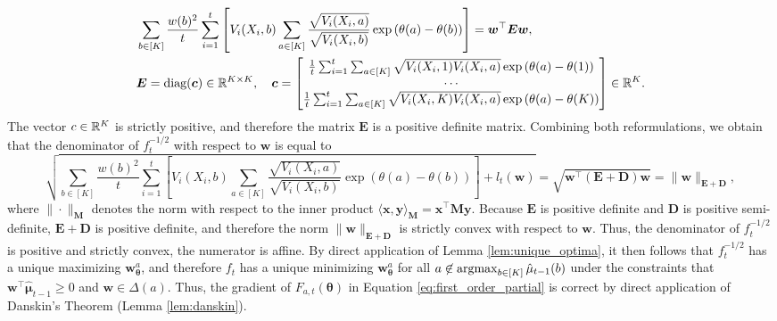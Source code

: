 \documentclass{article}
\begin{document}
\begin{appendices}
\begin{align}
     &\sum_{b \in [K]} \frac{w(b)^2}{t} \sum_{i=1}^t\left[V_i(X_i,b)\sum_{a \in [K]}\frac{ \sqrt{V_i(X_i,a) } }{\sqrt{V_i(X_i,b) } }\exp\left(\theta(a) - \theta(b)\right)\right] = \boldsymbol{w}^\top \boldsymbol{E} \boldsymbol{w}, \\
     &\boldsymbol{E} = \text{diag}(\boldsymbol{c}) \in \mathbb{R}^{K\times K}, \quad \boldsymbol{c} = \begin{bmatrix} \frac{1}{t}\sum_{i=1}^t\sum_{a \in [K]} \sqrt{V_i(X_i, 1)V_i(X_i, a)} \exp\left(\theta(a) - \theta(1)\right) \\
     \cdots \\
     \frac{1}{t}\sum_{i=1}^t\sum_{a \in [K]} \sqrt{V_i(X_i, K)V_i(X_i, a)} \exp\left(\theta(a) - \theta(K)\right)
     \end{bmatrix} \in \mathbb{R}^K.
\end{align}
The vector $c \in \mathbb{R}^K$ is strictly positive, and therefore the matrix $\bm{E}$ is a positive definite matrix. Combining both reformulations, we obtain that the denominator of $f_t^{-1/2}$ with respect to $\bm{w}$ is equal to 
\begin{equation}
    \sqrt{\sum_{b \in [K]} \frac{w(b)^2}{t} \sum_{i=1}^t\left[V_i(X_i,b)\sum_{a \in [K]}\frac{ \sqrt{V_i(X_i,a) } }{\sqrt{V_i(X_i,b) } }\exp\left(\theta(a) - \theta(b)\right)\right] + l_t(\bm{w})} = \sqrt{\bm{w}^\top \left( \bm{E} + \bm{D} \right)\bm{w}} = \|\bm{w} \|_{\bm{E}+\bm{D}},
\end{equation}
where $\| \cdot\|_{\bm{M}}$ denotes the norm with respect to the inner product $\langle \bm{x},\bm{y}\rangle_{\bm{M}} =  \bm{x}^\top\bm{M}\bm{y}$. Because $\bm{E}$ is positive definite and $\bm{D}$ is positive semi-definite, $\bm{E}+ \bm{D}$ is positive definite, and therefore the norm $\| \bm{w} \|_{\bm{E} + \bm{D}}$ is strictly convex with respect to $\bm{w}$. Thus, the denominator of $f_t^{-1/2}$ is positive and strictly convex, the numerator is affine. By direct application of Lemma \ref{lem:unique_optima}, it then follows that $f_t^{-1/2}$ has a unique maximizing $\bm{w}_{\bm\theta}^a$, and therefore $f_t$ has a unique minimizing $\bm{w}_{\bm{\theta}}^a$ for all $a \not\in \argmax_{b \in [K]} \hat\mu_{t-1}(b)$ under the constraints that $\bm{w}^\top \hat{\bm{\mu}}_{t-1} \geq 0$ and $\bm{w} \in \Delta(a)$. Thus, the gradient of $F_{a,t}(\bm{\theta})$ in Equation \eqref{eq:first_order_partial} is correct by direct application of Danskin's Theorem (Lemma \ref{lem:danskin}).  


\end{appendices}
\end{document}
